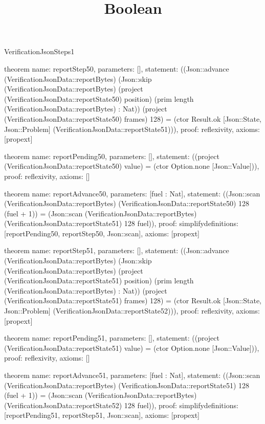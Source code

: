 \begin{lexlean}{VerificationJsonSteps1}
\title{Boolean}
\begin{semanticmodule}

theorem{
  name: reportStep50,
  parameters: [],
  statement: ((Json::advance (VerificationJsonData::reportBytes) (Json::skip (VerificationJsonData::reportBytes) (project (VerificationJsonData::reportState50) position) (prim length (VerificationJsonData::reportBytes) : Nat)) (project (VerificationJsonData::reportState50) frames) 128) = (ctor Result.ok [Json::State, Json::Problem] (VerificationJsonData::reportState51))),
  proof: reflexivity{},
  axioms: [propext]
}

theorem{
  name: reportPending50,
  parameters: [],
  statement: ((project (VerificationJsonData::reportState50) value) = (ctor Option.none [Json::Value])),
  proof: reflexivity{},
  axioms: []
}

theorem{
  name: reportAdvance50,
  parameters: [fuel : Nat],
  statement: ((Json::scan (VerificationJsonData::reportBytes) (VerificationJsonData::reportState50) 128 (fuel + 1)) = (Json::scan (VerificationJsonData::reportBytes) (VerificationJsonData::reportState51) 128 fuel)),
  proof: simplify{definitions: [reportPending50, reportStep50, Json::scan]},
  axioms: [propext]
}

theorem{
  name: reportStep51,
  parameters: [],
  statement: ((Json::advance (VerificationJsonData::reportBytes) (Json::skip (VerificationJsonData::reportBytes) (project (VerificationJsonData::reportState51) position) (prim length (VerificationJsonData::reportBytes) : Nat)) (project (VerificationJsonData::reportState51) frames) 128) = (ctor Result.ok [Json::State, Json::Problem] (VerificationJsonData::reportState52))),
  proof: reflexivity{},
  axioms: [propext]
}

theorem{
  name: reportPending51,
  parameters: [],
  statement: ((project (VerificationJsonData::reportState51) value) = (ctor Option.none [Json::Value])),
  proof: reflexivity{},
  axioms: []
}

theorem{
  name: reportAdvance51,
  parameters: [fuel : Nat],
  statement: ((Json::scan (VerificationJsonData::reportBytes) (VerificationJsonData::reportState51) 128 (fuel + 1)) = (Json::scan (VerificationJsonData::reportBytes) (VerificationJsonData::reportState52) 128 fuel)),
  proof: simplify{definitions: [reportPending51, reportStep51, Json::scan]},
  axioms: [propext]
}


\end{semanticmodule}
\end{lexlean}
